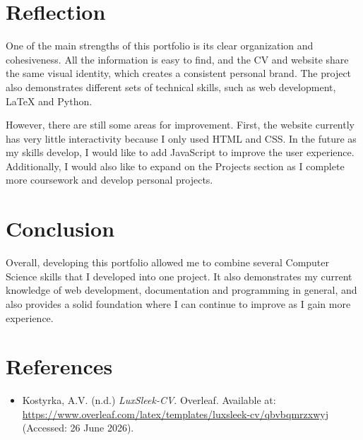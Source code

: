 \documentclass[12pt, a4paper]{article}
\begin{document}
\section{Reflection}
One of the main strengths of this portfolio is its clear organization and cohesiveness. All the information is easy to find, and the CV and website share the same visual identity, which creates a consistent personal brand. The project also demonstrates different sets of technical skills, such as web development, LaTeX and Python.

However, there are still some areas for improvement. First, the website currently has very little interactivity because I only used HTML and CSS. In the future as my skills develop, I would like to add JavaScript to improve the user experience. Additionally, I would also like to expand on the Projects section as I complete more coursework and develop personal projects.

\section{Conclusion}
Overall, developing this portfolio allowed me to combine several Computer Science skills that I developed into one project. It also demonstrates my current knowledge of web development, documentation and programming in general, and also provides a solid foundation where I can continue to improve as I gain more experience.

\section*{References}
\begin{itemize}
    \item Kostyrka, A.V. (n.d.) \textit{LuxSleek-CV}. Overleaf. Available at: \url{https://www.overleaf.com/latex/templates/luxsleek-cv/qbvbqmrzxwyj} (Accessed: 26 June 2026).
\end{itemize}
\end{document}
